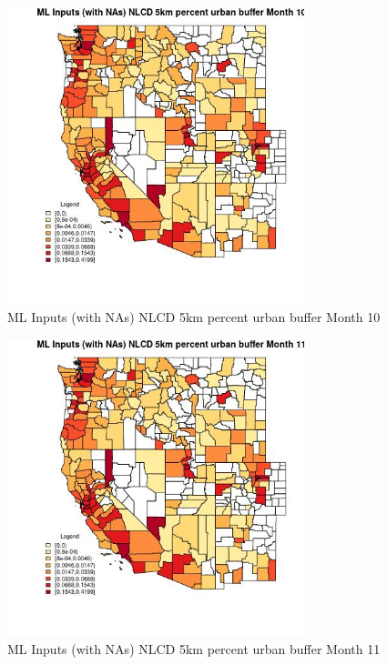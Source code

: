\begin{figure} 
\centering  
\includegraphics[width=0.77\textwidth]{Code_Outputs/Report_ML_input_PM25_Step4_part_f_de_duplicated_aves_prioritize_24hr_obswNAs_CountyNLCD_5km_percent_urban_buffermedianMonth10.jpg} 
\caption{\label{fig:Report_ML_input_PM25_Step4_part_f_de_duplicated_aves_prioritize_24hr_obswNAsCountyNLCD_5km_percent_urban_buffermedianMonth10}ML Inputs (with NAs) NLCD 5km percent urban buffer Month 10} 
\end{figure} 
 

\begin{figure} 
\centering  
\includegraphics[width=0.77\textwidth]{Code_Outputs/Report_ML_input_PM25_Step4_part_f_de_duplicated_aves_prioritize_24hr_obswNAs_CountyNLCD_5km_percent_urban_buffermedianMonth11.jpg} 
\caption{\label{fig:Report_ML_input_PM25_Step4_part_f_de_duplicated_aves_prioritize_24hr_obswNAsCountyNLCD_5km_percent_urban_buffermedianMonth11}ML Inputs (with NAs) NLCD 5km percent urban buffer Month 11} 
\end{figure} 
 

